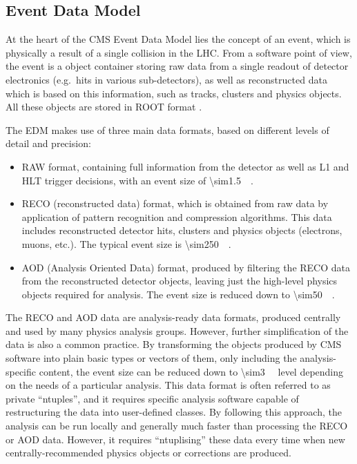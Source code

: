 \subsection{Event Data Model}
\label{ss:edm}
At the heart of the CMS Event Data Model lies the concept of an event, which is physically a result of a single
collision in the LHC. From a software point of view, the event is a \Cplusplus object container storing raw data from a
single readout of detector electronics (e.g.\ hits in various sub-detectors), as well as reconstructed data which is
based on this information, such as tracks, clusters and physics objects. All these \Cplusplus objects are stored in ROOT
format \autocite{ROOT}.

The EDM makes use of three main data formats, based on different levels of detail and precision:
\begin{itemize}
  \item RAW format, containing full information from the detector as well as L1 and HLT trigger decisions, with an event
  size of \SI{\sim1.5}{\mega\byte}.
  \item RECO (reconstructed data) format, which is obtained from raw data by application of pattern recognition and
  compression algorithms. This data includes reconstructed detector hits, clusters and physics objects (electrons,
  muons, etc.). The typical event size is \SI{\sim250}{\kilo\byte}.
  \item AOD (Analysis Oriented Data) format, produced by filtering the RECO data from the reconstructed detector
  objects, leaving just the high-level physics objects required for analysis. The event size is reduced down to
  \SI{\sim50}{\kilo\byte}.
\end{itemize}

The RECO and AOD data are analysis-ready data formats, produced centrally and used by many physics analysis groups.
However, further simplification of the data is also a common practice. By transforming the \Cplusplus objects produced
by CMS software into plain basic types or vectors of them, only including the analysis-specific content, the event size
can be reduced down to \SI{\sim3}{\kilo\byte} level depending on the needs of a particular analysis. This data format is
often referred to as private ``ntuples'', and it requires specific analysis software capable of restructuring the data
into user-defined classes. By following this approach, the analysis can be run locally and generally much faster than
processing the RECO or AOD data. However, it requires ``ntuplising'' these data every time when new centrally-recommended
physics objects or corrections are produced.

